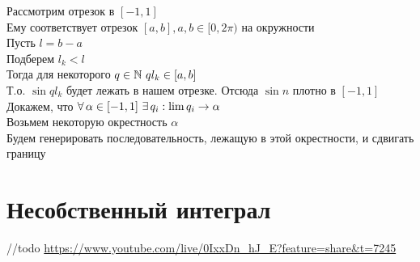 \documentclass[12pt]{article}
\begin{document}
Рассмотрим отрезок в $[-1, 1]$\\
Ему соответствует отрезок $[a,b], a,b \in [0,2\pi)$ на окружности\\
Пусть $l = b-a$\\
Подберем $l_k < l$\\
Тогда для некоторого $q \in \mathbb{N}\ ql_k\in [a,b]$\\
Т.о. $\sin ql_k$ будет лежать в нашем отрезке. Отсюда $\sin n$ плотно в $[-1, 1]$\\
Докажем, что $\forall\, \alpha\in [-1, 1]\ \exists\, q_i: \lim q_i \rightarrow \alpha$\\
Возьмем некоторую окрестность $\alpha$\\
Будем генерировать последовательность, лежащую в этой окрестности, и сдвигать границу
\section{Несобственный интеграл}
//todo \url{https://www.youtube.com/live/0IxxDn_hJ_E?feature=share&t=7245}
\end{document}
